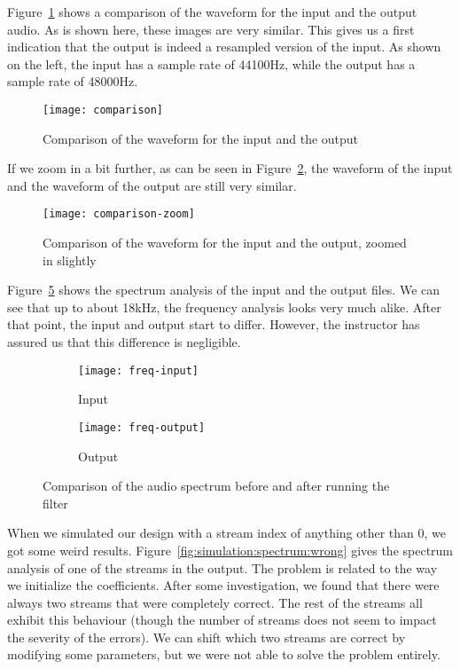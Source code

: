 Figure~\ref{fig:simulation:waveform} shows a comparison of the waveform for the input and the output audio.
As is shown here, these images are very similar.
This gives us a first indication that the output is indeed a resampled version of the input.
As shown on the left, the input has a sample rate of 44100Hz, while the output has a sample rate of 48000Hz.

\begin{figure}[H]
	\centering
	\texttt{[image: comparison]}
	\caption{Comparison of the waveform for the input and the output}
	\label{fig:simulation:waveform}
\end{figure}

If we zoom in a bit further, as can be seen in Figure~\ref{fig:simulation:waveformzoom}, the waveform of the input and the waveform of the output are still very similar.

\begin{figure}[H]
	\centering
	\texttt{[image: comparison-zoom]}
	\caption{Comparison of the waveform for the input and the output, zoomed in slightly}
	\label{fig:simulation:waveformzoom}
\end{figure}

Figure~\ref{fig:simulation:spectrum} shows the spectrum analysis of the input and the output files.
We can see that up to about 18kHz, the frequency analysis looks very much alike.
After that point, the input and output start to differ.
However, the instructor has assured us that this difference is negligible.

\begin{figure}[H]
	\centering
	\begin{subfigure}[l]{0.7\textwidth}
		\texttt{[image: freq-input]}
		\caption{Input}
		\label{fig:simulation:spectrum:before}
	\end{subfigure}

	\begin{subfigure}[l]{0.7\textwidth}
		\texttt{[image: freq-output]}
		\caption{Output}
		\label{fig:simulation:spectrum:after}
	\end{subfigure}

	\caption{Comparison of the audio spectrum before and after running the filter}
	\label{fig:simulation:spectrum}
\end{figure}

When we simulated our design with a stream index of anything other than 0, we got some weird results.
Figure~\ref{fig:simulation:spectrum:wrong} gives the spectrum analysis of one of the streams in the output.
The problem is related to the way we initialize the coefficients.
After some investigation, we found that there were always two streams that were completely correct.
The rest of the streams all exhibit this behaviour (though the number of streams does not seem to impact the severity of the errors).
We can shift which two streams are correct by modifying some parameters, but we were not able to solve the problem entirely.

